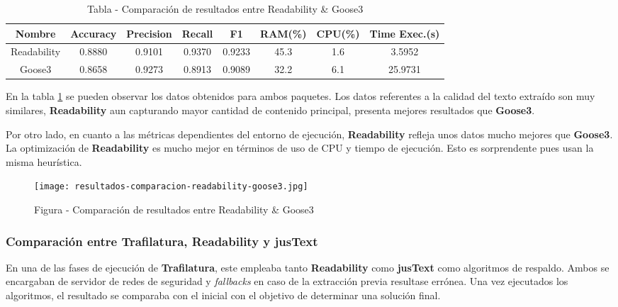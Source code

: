 \begin{table}[h]
    \begin{center}
      \begin{tabular}{| c | c | c | c | c | c | c | c |} \hline 
       \textbf{Nombre} & \textbf{Accuracy} & \textbf{Precision}  & \textbf{Recall} & \textbf{F1} & \textbf{RAM(\%)} & \textbf{CPU(\%)} & \textbf{Time Exec.(s)} \\ \hline
       Readability & 0.8880 & 0.9101 & 0.9370 & 0.9233 & 45.3 & 1.6 & 3.5952 \\ \hline
       Goose3 & 0.8658 & 0.9273 & 0.8913 & 0.9089 & 32.2 & 6.1 & 25.9731 \\ \hline
      \end{tabular}
      \caption{Tabla - Comparación de resultados entre Readability \& Goose3}
      \label{tab:tabla - comparacion de resultados entre readability y goose3 2}
    \end{center}
\end{table}

En la tabla \ref{tab:tabla - comparacion de resultados entre readability y goose3 2} se pueden observar los
datos obtenidos para ambos paquetes. Los datos referentes a la calidad del texto extraído son muy similares,
\textbf{Readability} aun capturando mayor cantidad de contenido principal, presenta mejores resultados que
\textbf{Goose3}.

Por otro lado, en cuanto a las métricas dependientes del entorno de ejecución, \textbf{Readability} refleja
unos datos mucho mejores que \textbf{Goose3}. La optimización de \textbf{Readability} es mucho mejor en
términos de uso de CPU y tiempo de ejecución. Esto es sorprendente pues usan la misma heurística.

\begin{figure}[tphb]
    \centering
    \texttt{[image: resultados-comparacion-readability-goose3.jpg]}
    \caption{Figura - Comparación de resultados entre Readability \& Goose3}
    \label{img:figura - comparacion de resultados entre readability y goose3 2}
\end{figure}

\subsubsection{Comparación entre Trafilatura, Readability y jusText}
\label{subsec:comparacion entre trafilatura, readability y justext}

En una de las fases de ejecución de \textbf{Trafilatura}, este empleaba tanto \textbf{Readability} como
\textbf{jusText} como algoritmos de respaldo. Ambos se encargaban de servidor de redes de seguridad y
\emph{fallbacks} en caso de la extracción previa resultase errónea. Una vez ejecutados los algoritmos, el
resultado se comparaba con el inicial con el objetivo de determinar una solución final.

